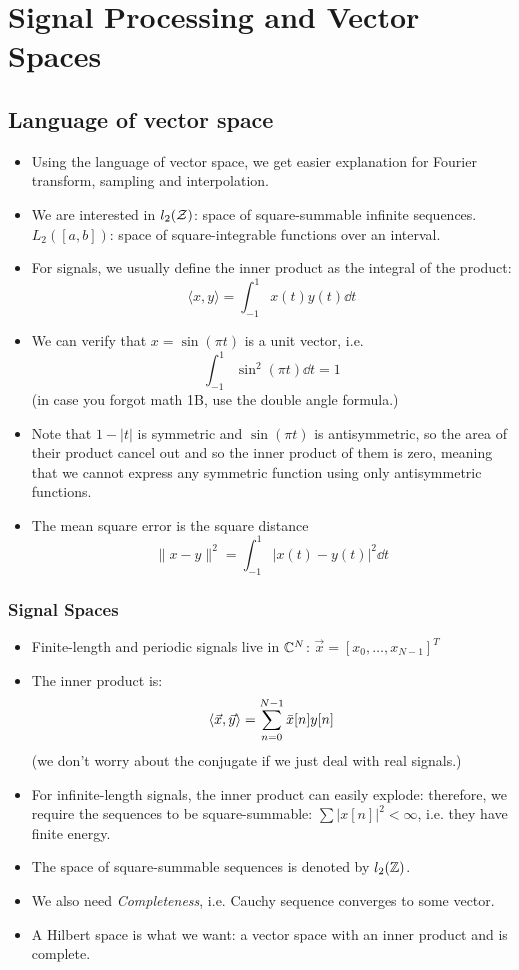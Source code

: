 \documentclass[../main.tex]{subfiles}
\begin{document}
\chapter{Signal Processing and Vector Spaces}
\section{Language of vector space}
\begin{itemize}
    \item Using the language of vector space, we get easier explanation for Fourier transform, sampling and interpolation.
    \item We are interested in $l_2(\mathcal{Z})$: space of square-summable infinite sequences. $L_2([a,b])$: space of square-integrable functions over an interval.
    \item For signals, we usually define the inner product as the integral of the product: \[
    \langle x,y\rangle = \int_{-1}^{1}x(t)y(t)\dd t
    \]
    \item We can verify that $x=\sin(\pi t)$ is a unit vector, i.e. \[
    \int_{-1}^{1}\sin^2(\pi t)\dd t = 1
    \] (in case you forgot math 1B, use the double angle formula.)
    \item Note that $1-|t|$ is symmetric and $\sin(\pi t)$ is antisymmetric, so the area of their product cancel out and so the inner product of them is zero, meaning that we cannot express any symmetric function using only antisymmetric functions.
    \item The mean square error is the square distance\[
    \|x-y\|^2 = \int_{-1}^1|x(t)-y(t)|^2\dd t
    \]
\end{itemize}
\subsection*{Signal Spaces}
\begin{itemize}
    \item Finite-length and periodic signals live in $\mathbb{C}^N$: $\vec x=[x_0,\dots,x_{N-1}]^T$
    \item The inner product is: \[
    \langle \vec x,\vec y\rangle = \sum_{n=0}^{N-1}\Bar{x}[n]y[n]
    \] (we don't worry about the conjugate if we just deal with real signals.)
    \item For infinite-length signals, the inner product can easily explode: therefore, we require the sequences to be square-summable: $\sum |x[n]|^2 < \infty$, i.e. they have finite energy.
    \item The space of square-summable sequences is denoted by $l_2(\mathbb{Z})$.
    \item We also need \textit{Completeness}, i.e. Cauchy sequence converges to some vector.
    \item A Hilbert space is what we want: a vector space with an inner product and is complete.
\end{itemize}
\end{document}
